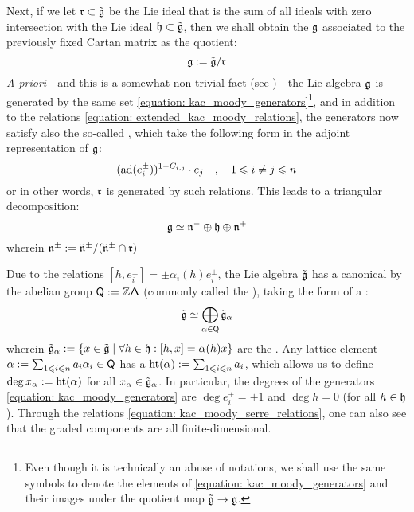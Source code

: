 Next, if we let $\mathfrak{r} \subset \tilde{\mathfrak{g}}$ be the Lie ideal that is the sum of all ideals with zero intersection with the Lie ideal $\mathfrak{h} \subset \tilde{\mathfrak{g}}$, then we shall obtain the  $\mathfrak{g}$ associated to the previously fixed Cartan matrix as the quotient:
    $$\mathfrak{g} := \tilde{\mathfrak{g}}/\mathfrak{r}$$
\textit{A priori} - and this is a somewhat non-trivial fact (see \cite[Theorem 9.11]{kac_infinite_dimensional_lie_algebras}) - the Lie algebra $\mathfrak{g}$ is generated by the same set \eqref{equation: kac_moody_generators}\footnote{Even though it is technically an abuse of notations, we shall use the same symbols to denote the elements of \eqref{equation: kac_moody_generators} and their images under the quotient map $\tilde{\mathfrak{g}} \to \mathfrak{g}$.}, and in addition to the relations \eqref{equation: extended_kac_moody_relations}, the generators now satisfy also the so-called , which take the following form in the adjoint representation of $\mathfrak{g}$:
    \begin{equation} \label{equation: kac_moody_serre_relations}
        ( \mathrm{ad}( e_i^{\pm} ) )^{1 - C_{i, j}} \cdot e_j \quad, \quad 1 \leqslant i \not = j \leqslant n
    \end{equation}
or in other words, $\mathfrak{r}$ is generated by such relations. This leads to a triangular decomposition:
    $$\mathfrak{g} \simeq \mathfrak{n}^- \oplus \mathfrak{h} \oplus \mathfrak{n}^+$$
wherein $\mathfrak{n}^{\pm} := \tilde{\mathfrak{n}}^{\pm}/( \tilde{\mathfrak{n}}^{\pm} \cap \mathfrak{r} )$

Due to the relations $[h, e_i^{\pm}] = \pm \alpha_i(h) e_i^{\pm}$, the Lie algebra $\tilde{\mathfrak{g}}$ has a canonical  by the abelian group $\mathsf{Q} := \mathbb{Z} \mathsf{\Delta}$ (commonly called the ), taking the form of a :
    $$\tilde{\mathfrak{g}} \simeq \bigoplus_{\alpha \in \mathsf{Q}} \tilde{\mathfrak{g}}_{\alpha}$$
wherein $\tilde{\mathfrak{g}}_{\alpha} := \{ x \in \tilde{\mathfrak{g}} \mid \forall h \in \mathfrak{h}: [h, x] = \alpha(h) x \}$ are the . Any lattice element $\alpha := \sum_{1 \leqslant i \leqslant n} a_i \alpha_i \in \mathsf{Q}$ has a  $\operatorname{ht}(\alpha) := \sum_{1 \leqslant i \leqslant n} a_i$, which allows us to define $\deg x_{\alpha} := \operatorname{ht}(\alpha)$ for all $x_{\alpha} \in \tilde{\mathfrak{g}}_{\alpha}$. In particular, the degrees of the generators \eqref{equation: kac_moody_generators} are $\deg e_i^{\pm} = \pm 1$ and $\deg h = 0$ (for all $h \in \mathfrak{h}$). Through the relations \eqref{equation: kac_moody_serre_relations}, one can also see that the graded components are all finite-dimensional.

